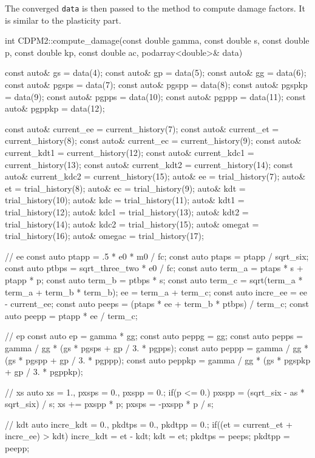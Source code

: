 The converged \texttt{data} is then passed to the method to compute damage factors. It is similar to the plasticity part.
\begin{cppcode}
int CDPM2::compute_damage(const double gamma, const double s, const double p, const double kp, const double ac, podarray<double>& data) {
    const auto& gs = data(4);
    const auto& gp = data(5);
    const auto& gg = data(6);
    const auto& pgsps = data(7);
    const auto& pgspp = data(8);
    const auto& pgspkp = data(9);
    const auto& pgpps = data(10);
    const auto& pgppp = data(11);
    const auto& pgppkp = data(12);

    const auto& current_ee = current_history(7);
    const auto& current_et = current_history(8);
    const auto& current_ec = current_history(9);
    const auto& current_kdt1 = current_history(12);
    const auto& current_kdc1 = current_history(13);
    const auto& current_kdt2 = current_history(14);
    const auto& current_kdc2 = current_history(15);
    auto& ee = trial_history(7);
    auto& et = trial_history(8);
    auto& ec = trial_history(9);
    auto& kdt = trial_history(10);
    auto& kdc = trial_history(11);
    auto& kdt1 = trial_history(12);
    auto& kdc1 = trial_history(13);
    auto& kdt2 = trial_history(14);
    auto& kdc2 = trial_history(15);
    auto& omegat = trial_history(16);
    auto& omegac = trial_history(17);

    // ee
    const auto ptapp = .5 * e0 * m0 / fc;
    const auto ptaps = ptapp / sqrt_six;
    const auto ptbps = sqrt_three_two * e0 / fc;
    const auto term_a = ptaps * s + ptapp * p;
    const auto term_b = ptbps * s;
    const auto term_c = sqrt(term_a * term_a + term_b * term_b);
    ee = term_a + term_c;
    const auto incre_ee = ee - current_ee;
    const auto peeps = (ptaps * ee + term_b * ptbps) / term_c;
    const auto peepp = ptapp * ee / term_c;

    // ep
    const auto ep = gamma * gg;
    const auto peppg = gg;
    const auto pepps = gamma / gg * (gs * pgsps + gp / 3. * pgpps);
    const auto peppp = gamma / gg * (gs * pgspp + gp / 3. * pgppp);
    const auto peppkp = gamma / gg * (gs * pgspkp + gp / 3. * pgppkp);

    // xs
    auto xs = 1., pxsps = 0., pxspp = 0.;
    if(p <= 0.) {
        pxspp = (sqrt_six - as * sqrt_six) / s;
        xs += pxspp * p;
        pxsps = -pxspp * p / s;
    }

    // kdt
    auto incre_kdt = 0., pkdtps = 0., pkdtpp = 0.;
    if((et = current_et + incre_ee) > kdt) {
        incre_kdt = et - kdt;
        kdt = et;
        pkdtps = peeps;
        pkdtpp = peepp;
    }

}
\end{cppcode}
